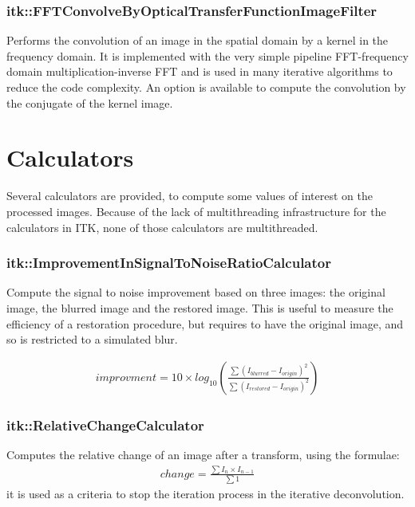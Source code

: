 \documentclass{InsightArticle}
\begin{document}
\subsubsection{itk::FFTConvolveByOpticalTransferFunctionImageFilter}

Performs the convolution of an image in the spatial domain by a kernel in the frequency domain. It is implemented with the very
simple pipeline FFT-frequency domain multiplication-inverse FFT and is used in many iterative algorithms to reduce the code
complexity.
An option is available to compute the convolution by the conjugate of the kernel image.

\section{Calculators}

Several calculators are provided, to compute some values of interest on the processed images.
Because of the lack of multithreading infrastructure for the calculators in ITK, none of those calculators are
multithreaded.

\subsubsection{itk::ImprovementInSignalToNoiseRatioCalculator}

Compute the signal to noise improvement based on three images: the original image, the blurred image and the restored image.
This is useful to measure the efficiency of a restoration procedure, but requires to have the original image, and so is
restricted to a simulated blur.

\begin{eqnarray}
\label{eq:imageFormation}
improvment = 10 \times log_{10}\left(\frac{\sum (I_{blurred} - I_{origin} )^2}{\sum (I_{restored} - I_{origin} )^2}\right)
\end{eqnarray}

\subsubsection{itk::RelativeChangeCalculator}

Computes the relative change of an image after a transform, using the formulae:
\begin{eqnarray}
\label{eq:imageFormation}
change = \frac{\sum I_n \times I_{n-1}}{\sum 1}
\end{eqnarray}
it is used as a criteria to stop the iteration process in the iterative deconvolution.
\end{document}
